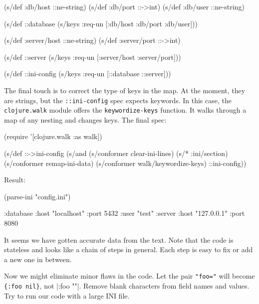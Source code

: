 \else

\begin{english}
  \begin{clojure}
(s/def :db/host ::ne-string)
(s/def :db/port ::->int)
(s/def :db/user ::ne-string)

(s/def ::database
  (s/keys :req-un [:db/host :db/port :db/user]))

(s/def :server/host ::ne-string)
(s/def :server/port ::->int)

(s/def ::server
  (s/keys :req-un [:server/host :server/port]))

(s/def ::ini-config
  (s/keys :req-un [::database ::server]))
  \end{clojure}
\end{english}

\fi


The final touch is to correct the type of keys in the map. At the moment, they are strings, but the \verb|::ini-config| spec expects keywords. In this case, the \verb|clojure.walk| module offers the \verb|keywordize-keys| function. It walks through a map of any nesting and changes keys. The final spec:

\begin{english}
  \begin{clojure}
(require '[clojure.walk :as walk])

(s/def ::->ini-config
  (s/and
   (s/conformer clear-ini-lines)
   (s/* :ini/section)
   (s/conformer remap-ini-data)
   (s/conformer walk/keywordize-keys)
   ::ini-config))
  \end{clojure}
\end{english}

\noindent
Result:

\begin{english}
  \begin{clojure}
(parse-ini "config.ini")

{:database {:host "localhost"
            :port 5432
            :user "test"}
 :server {:host "127.0.0.1"
          :port 8080}}
  \end{clojure}
\end{english}

It seems we have gotten accurate data from the text. Note that the code is stateless and looks like a chain of steps in general. Each step is easy to fix or add a new one in between.

Now we might eliminate minor flaws in the code. Let the pair \verb|"foo="| will become \verb|{:foo nil}|, not \spverb|{:foo ""}|. Remove blank characters from field names and values. Try to run our code with a large INI file.

